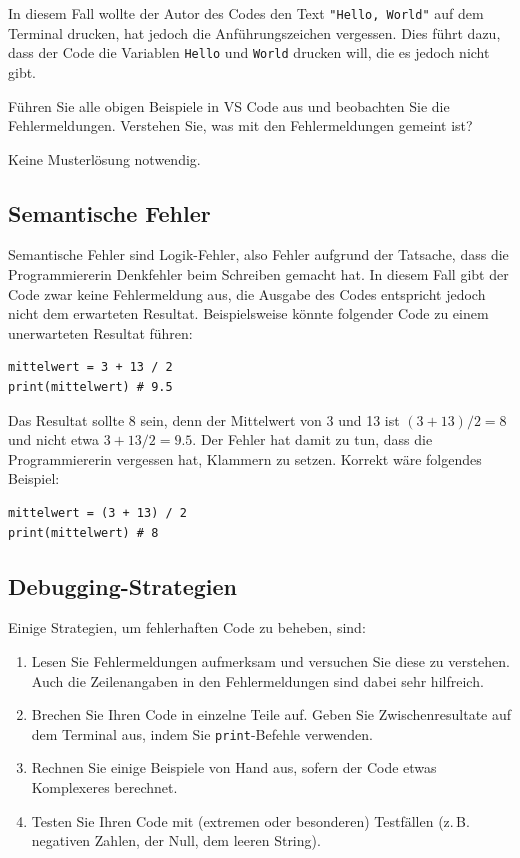 In diesem Fall wollte der Autor des Codes den Text \lstinline|"Hello, World"| auf dem Terminal drucken, hat jedoch die Anführungszeichen vergessen. Dies führt dazu, dass der Code die Variablen \texttt{Hello} und \texttt{World} drucken will, die es jedoch nicht gibt.

\begin{myexercise}
	Führen Sie alle obigen Beispiele in VS Code aus und beobachten Sie die Fehlermeldungen. Verstehen Sie, was mit den Fehlermeldungen gemeint ist?
	\begin{myanswer}
		Keine Musterlösung notwendig.
	\end{myanswer}
\end{myexercise}


\subsection{Semantische Fehler}
\label{subsec:semantische-fehler}
Semantische Fehler sind Logik-Fehler, also Fehler aufgrund der Tatsache, dass die Programmiererin Denkfehler beim Schreiben gemacht hat. In diesem Fall gibt der Code zwar keine Fehlermeldung aus, die Ausgabe des Codes entspricht jedoch nicht dem erwarteten Resultat. Beispielsweise könnte folgender Code zu einem unerwarteten Resultat führen:

\begin{lstlisting}
mittelwert = 3 + 13 / 2
print(mittelwert) # 9.5
\end{lstlisting}
Das Resultat sollte 8 sein, denn der Mittelwert von 3 und 13 ist $(3 + 13) / 2 = 8$ und nicht etwa $3 + 13 / 2 = 9.5$. Der Fehler hat damit zu tun, dass die Programmiererin vergessen hat, Klammern zu setzen. Korrekt wäre folgendes Beispiel:
\begin{lstlisting}
mittelwert = (3 + 13) / 2
print(mittelwert) # 8
\end{lstlisting}

\subsection{Debugging-Strategien}
Einige Strategien, um fehlerhaften Code zu beheben, sind:
\begin{enumerate}
	\item Lesen Sie Fehlermeldungen aufmerksam und versuchen Sie diese zu verstehen. Auch die Zeilenangaben in den Fehlermeldungen sind dabei sehr hilfreich.
	\item Brechen Sie Ihren Code in einzelne Teile auf. Geben Sie Zwischenresultate auf dem Terminal aus, indem Sie \lstinline|print|-Befehle verwenden.
	\item Rechnen Sie einige Beispiele von Hand aus, sofern der Code etwas Komplexeres berechnet.
	\item Testen Sie Ihren Code mit (extremen oder besonderen) Testfällen (z.\,B. negativen Zahlen, der Null, dem leeren String).
\end{enumerate}

